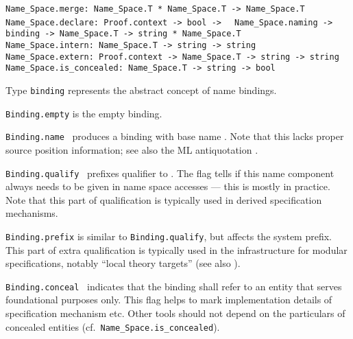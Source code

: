 \begin{isabellebody}
\begin{isamarkuptext}
\begin{mldecls}
  \verb|Name_Space.merge: Name_Space.T * Name_Space.T -> Name_Space.T| \\
  \verb|Name_Space.declare: Proof.context -> bool ->|\isasep\isanewline%
\verb|  Name_Space.naming -> binding -> Name_Space.T -> string * Name_Space.T| \\
  \verb|Name_Space.intern: Name_Space.T -> string -> string| \\
  \verb|Name_Space.extern: Proof.context -> Name_Space.T -> string -> string| \\
  \verb|Name_Space.is_concealed: Name_Space.T -> string -> bool|
  \end{mldecls}

  \begin{description}

  \item Type \verb|binding| represents the abstract concept of
  name bindings.

  \item \verb|Binding.empty| is the empty binding.

  \item \verb|Binding.name|~ produces a binding with base
  name .  Note that this lacks proper source position
  information; see also the ML antiquotation \hyperlink{ML antiquotation.binding}{\mbox{}}.

  \item \verb|Binding.qualify|~
  prefixes qualifier  to .  The  flag tells if this name component always needs to be
  given in name space accesses --- this is mostly  in
  practice.  Note that this part of qualification is typically used in
  derived specification mechanisms.

  \item \verb|Binding.prefix| is similar to \verb|Binding.qualify|, but
  affects the system prefix.  This part of extra qualification is
  typically used in the infrastructure for modular specifications,
  notably ``local theory targets'' (see also ).

  \item \verb|Binding.conceal|~ indicates that the
  binding shall refer to an entity that serves foundational purposes
  only.  This flag helps to mark implementation details of
  specification mechanism etc.  Other tools should not depend on the
  particulars of concealed entities (cf.\ \verb|Name_Space.is_concealed|).


\end{description}
\end{isamarkuptext}
\end{isabellebody}
